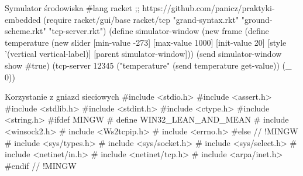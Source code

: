 \documentclass{beamer}
\newenvironment{Snippet}{\Verbatim[samepage=true,fontsize=\footnotesize]}{\endVerbatim}
\begin{document}
\begin{frame}[fragile]{Symulator środowiska}
  \begin{Snippet}
    #lang racket
    ;; https://github.com/panicz/praktyki-embedded
  \end{Snippet}
  \pause
  \begin{Snippet}
    (require racket/gui/base racket/tcp
             "grand-syntax.rkt" "ground-scheme.rkt"
             "tcp-server.rkt")
  \end{Snippet}
  \pause
  \begin{Snippet}
    (define simulator-window (new frame%
  \end{Snippet}
  \pause
  \begin{Snippet}
    (define temperature
      (new slider%
                   [min-value -273]
                   [max-value 1000]
                   [init-value 20]
                   [style '(vertical vertical-label)]
                   [parent simulator-window]))
  \end{Snippet}
  \pause
  \begin{Snippet}
    (send simulator-window show #true)
  \end{Snippet}
  \pause
  \begin{Snippet}
    (tcp-server 12345
     ("temperature" (send temperature get-value))
     (_ 0))
  \end{Snippet}
\end{frame}

\begin{frame}[fragile]{Korzystanie z gniazd sieciowych}
  \begin{Snippet}
    #include <stdio.h>
    #include <assert.h>
    #include <stdlib.h>
    #include <stdint.h>
    #include <ctype.h>
    #include <string.h>
    #ifdef MINGW
    #  define WIN32_LEAN_AND_MEAN
    #  include <winsock2.h>
    #  include <Ws2tcpip.h>
    #  include <errno.h>
    #else // !MINGW
    #  include <sys/types.h>
    #  include <sys/socket.h>
    #  include <sys/select.h>
    #  include <netinet/in.h>
    #  include <netinet/tcp.h>
    #  include <arpa/inet.h>
    #endif // !MINGW

  \end{Snippet}
\end{frame}
\end{document}
